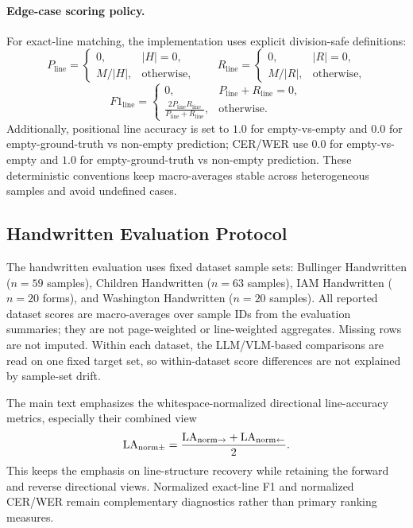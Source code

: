 \paragraph{Edge-case scoring policy.}
For exact-line matching, the implementation uses explicit division-safe definitions:
\begin{equation}
P_{\mathrm{line}}=
\begin{cases}
0, & |H|=0,\\
M/|H|, & \text{otherwise},
\end{cases}
\qquad
R_{\mathrm{line}}=
\begin{cases}
0, & |R|=0,\\
M/|R|, & \text{otherwise},
\end{cases}
\label{eq:edge_exact_pr}
\end{equation}
\begin{equation}
F1_{\mathrm{line}}=
\begin{cases}
0, & P_{\mathrm{line}}+R_{\mathrm{line}}=0,\\
\frac{2P_{\mathrm{line}}R_{\mathrm{line}}}{P_{\mathrm{line}}+R_{\mathrm{line}}}, & \text{otherwise}.
\end{cases}
\label{eq:edge_exact_f1}
\end{equation}
Additionally, positional line accuracy is set to $1.0$ for empty-vs-empty and $0.0$ for empty-ground-truth vs non-empty prediction; CER/WER use $0.0$ for empty-vs-empty and $1.0$ for empty-ground-truth vs non-empty prediction. These deterministic conventions keep macro-averages stable across heterogeneous samples and avoid undefined cases.

\subsection{Handwritten Evaluation Protocol}
\label{sec:experimentation_handwritten_protocol}

The handwritten evaluation uses fixed dataset sample sets: Bullinger Handwritten (\(n=59\) samples), Children Handwritten (\(n=63\) samples), IAM Handwritten (\(n=20\) forms), and Washington Handwritten (\(n=20\) samples). All reported dataset scores are macro-averages over sample IDs from the evaluation summaries; they are not page-weighted or line-weighted aggregates. Missing rows are not imputed. Within each dataset, the LLM/VLM-based comparisons are read on one fixed target set, so within-dataset score differences are not explained by sample-set drift.

The main text emphasizes the whitespace-normalized directional line-accuracy metrics, especially their combined view
\begin{equation}
\mathrm{LA}_{\mathrm{norm}\pm}=\frac{\mathrm{LA}_{\mathrm{norm}\rightarrow}+\mathrm{LA}_{\mathrm{norm}\leftarrow}}{2}.
\label{eq:experimentation_combined_line_acc}
\end{equation}
This keeps the emphasis on line-structure recovery while retaining the forward and reverse directional views. Normalized exact-line F1 and normalized CER/WER remain complementary diagnostics rather than primary ranking measures.

